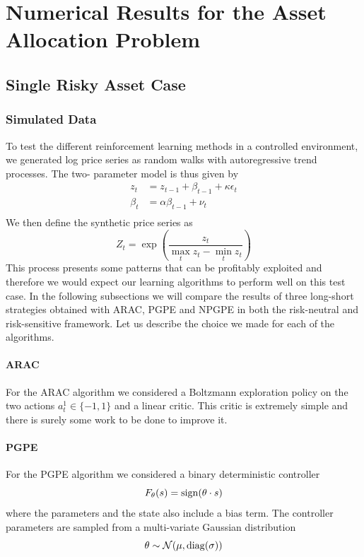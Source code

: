 \chapter{Numerical Results for the Asset Allocation Problem}

\section{Single Risky Asset Case}


\subsection{Simulated Data}
To test the different reinforcement learning methods in a controlled environment, we generated log price series as random walks with autoregressive trend processes. The two-
parameter model is thus given by
\begin{equation*}
	\begin{split}
		z_t &= z_{t-1} + \beta_{t-1} + \kappa \epsilon_t\\
		\beta_t &= \alpha \beta_{t-1} + \nu_t\\
	\end{split}
\end{equation*}
We then define the synthetic price series as
\begin{equation*}
	Z_t = \exp\left(\frac{z_t}{\max_t z_t - \min_t z_t}\right)
\end{equation*}
This process presents some patterns that can be profitably exploited and therefore we would expect our learning algorithms to perform well on this test case. In the following subsections we will compare the results of three long-short strategies obtained with ARAC, PGPE and NPGPE in both the risk-neutral and risk-sensitive framework. Let us describe the choice we made for each of the algorithms. 

\subsubsection{ARAC} 
For the ARAC algorithm we considered a Boltzmann exploration policy on the two actions $a_t^1 \in \{-1, 1\}$ and a linear critic. This critic is extremely simple and there is surely some work to be done to improve it. 

\subsubsection{PGPE}
For the PGPE algorithm we considered a binary deterministic controller 
\begin{equation*}
	F_\theta(s) = \operatorname{sign}(\theta \cdot s)
\end{equation*}
where the parameters and the state also include a bias term. The controller parameters are sampled from a multi-variate Gaussian distribution
\begin{equation*}
	\theta \sim \mathcal{N}(\mu, \operatorname{diag}(\sigma))
\end{equation*}  

